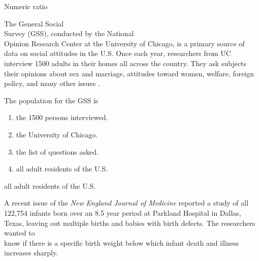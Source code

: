 \documentclass[11pt, chapterprefix=true]{scrbook}\usepackage[]{graphicx}\usepackage[]{color}
\begin{document}
\begin{exercises}
\begin{exercise}
    \vspace{4mm}


  \end{exercise}
  \vspace{2mm}
  \begin{solution}   %

    Numeric  ratio

  \end{solution}

	\begin{exercise}  %

	  The General Social \\ Survey (GSS), conducted by the National \\ Opinion Research Center at the University of Chicago, is a primary source of data on social attitudes in the U.S.  Once each year, researchers from UC interview 1500 adults in their homes all across the country.  They ask subjects their opinions about sex and marriage, attitudes toward women, welfare, foreign policy, and many other issues \cite{GSS2014}.

    The population for the GSS is
    \begin{enumerate}
    \item the 1500 persons interviewed.
    \item the University of Chicago.
    \item the list of questions asked.
    \item all adult residents of the U.S.
    \end{enumerate}
    \vspace{3mm}

  \end{exercise}
  \vspace{2mm}
  \begin{solution}   %

    all adult residents of the U.S.
  \end{solution}

\begin{exercise}  %

	  A recent issue of the \emph{New England Journal of Medicine} reported a study of all 122,754 infants born over an 8.5 year period at Parkland Hospital in Dallas, Texas, leaving out multiple births and babies with birth defects.  The researchers  wanted to \\ know if there is a specific birth weight below which infant death and illness increases sharply.


\end{exercise}
\end{exercises}
\end{document}
